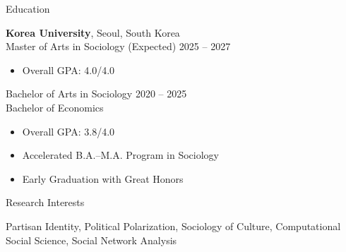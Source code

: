 \documentclass{resume} %
\begin{document}

\begin{rSection}{Education}

{\bf Korea University}, Seoul, South Korea
\\ Master of Arts in Sociology (Expected) \hfill {2025 -- 2027}
\begin{itemize}
  \item Overall GPA: 4.0/4.0
\end{itemize}
\smallskip
Bachelor of Arts in Sociology  \hfill {2020 -- 2025}
\\ Bachelor of Economics
\begin{itemize}
  \item Overall GPA: 3.8/4.0
  \item Accelerated B.A.--M.A. Program in Sociology
  \item Early Graduation with Great Honors
\end{itemize}

\end{rSection}


\begin{rSection}{Research Interests}

Partisan Identity, Political Polarization, Sociology of Culture, Computational Social Science, Social Network Analysis

\end{rSection}

\end{document}
